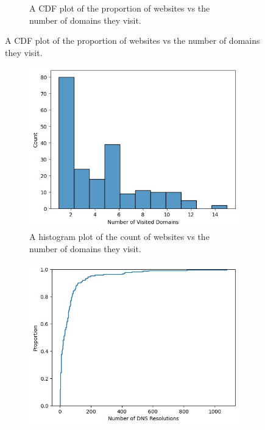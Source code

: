 \documentclass{article}
\begin{document}
\begin{figure}[htpb]
\begin{subfigure}[b]{0.48\linewidth}
        \vspace{-7mm}
        \caption{A CDF plot of the proportion of websites vs the number of domains they visit.}
        \vspace{-3mm}
        \label{fig:visited-cdf}
    \end{subfigure}
\end{figure}

\begin{figure}[htpb]
    \centering
    \begin{subfigure}[b]{0.48\linewidth}
        \includegraphics[width=\linewidth]{plots/visited-hist.jpeg}
        \vspace{-7mm}
        \caption{A histogram plot of the count of websites vs the number of domains they visit.}
        \vspace{-3mm}
        \label{fig:visited-hist}
    \end{subfigure}
    \hfill
    \begin{subfigure}[b]{0.48\linewidth}
        \includegraphics[width=\linewidth]{plots/num-res-cdf.jpeg}

\end{subfigure}
\end{figure}
\end{document}
